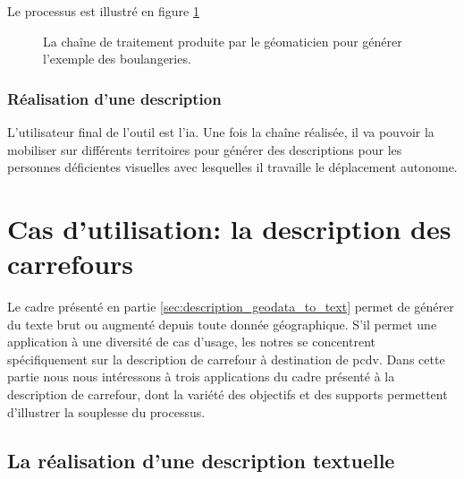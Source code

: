 Le processus est illustré en figure \ref{fig:desc_chaine_sig}

\begin{figure}
    \centering
    \caption[Chaîne de traitement de réalisation de description]{La chaîne de traitement produite par le géomaticien pour générer l'exemple des boulangeries.}
    \label{fig:desc_chaine_sig}
\end{figure}

\subsubsection{Réalisation d'une description}

L’utilisateur final de l’outil est l’\gls{ia}. Une fois la chaîne réalisée, il va pouvoir la mobiliser sur différents territoires pour générer des descriptions pour les personnes déficientes visuelles avec lesquelles il travaille le déplacement autonome.

\section{Cas d'utilisation: la description des carrefours}

Le cadre présenté en partie \ref{sec:description_geodata_to_text} permet de générer du texte brut ou augmenté depuis toute donnée géographique. S'il permet une application à une diversité de cas d'usage, les notres se concentrent spécifiquement sur la description de carrefour à destination de \gls{pcdv}. Dans cette partie nous nous intéressons à trois applications du cadre présenté à la description de carrefour, dont la variété des objectifs et des supports permettent d'illustrer la souplesse du processus.

\subsection{La réalisation d'une description textuelle}

